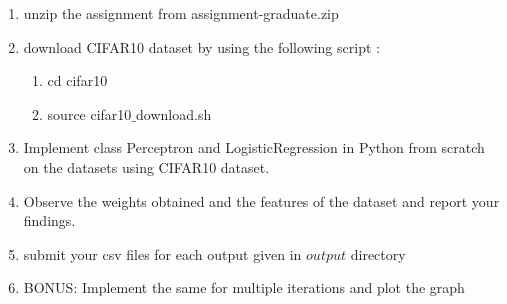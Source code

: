 \documentclass[11pt]{article}
\begin{document}
\begin{enumerate}
  \item  unzip the assignment from  assignment-graduate.zip
  \item download CIFAR10 dataset by using the following script :
  \begin{enumerate}
    \item cd cifar10
    \item source cifar10$\_$download.sh
  \end{enumerate} 
  \item Implement class Perceptron and LogisticRegression in Python from scratch on the datasets using CIFAR10 dataset.
  \item Observe the weights obtained and the features of the dataset and report your findings.
  \item submit your csv files for each output given in $output$ directory
  \item BONUS: Implement the same for multiple iterations and plot the graph
  \end{enumerate}
\end{document}
